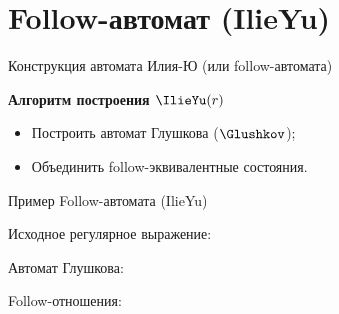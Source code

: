 \section{Follow-автомат (IlieYu)}
\begin{frame}{Конструкция автомата Илия-Ю (или follow-автомата)}
  \begin{block}{\bf Алгоритм построения $\IlieYu(r)$}
    \begin{itemize}
      \item Построить автомат Глушкова ($\Glushkov$);
      \item Объединить follow-эквивалентные состояния.
    \end{itemize}
  \end{block} %
\end{frame}

\begin{frame}{Пример Follow-автомата (IlieYu)} {\vspace{-5pt}}
  \vspace{-5pt}
   {
    Исходное регулярное выражение:

  }
   {
    Автомат Глушкова:

  }
   {
    Follow-отношения:
  }
\end{frame}
